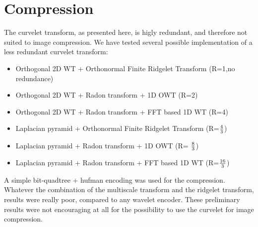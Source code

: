 \documentclass[11pt,a4paper]{article}
\begin{document}
\section{Compression}
The curvelet transform, as presented here, is higly redundant, and therefore
not suited to image compression. We have tested several possible implementation
of a less redundant curvelet transform:
\begin{itemize}
\item Orthogonal 2D WT + Orthonormal Finite Ridgelet Transform (R=1,no redundance)
\item Orthogonal 2D WT + Radon transform + 1D OWT (R=2)
\item Orthogonal 2D WT + Radon transform + FFT based 1D WT (R=4)
\item Laplacian pyramid + Orthonormal Finite Ridgelet Transform (R=${4\over 3}$)
\item Laplacian pyramid + Radon transform + 1D OWT (R= ${8\over 3}$)
\item Laplacian pyramid +  Radon transform + FFT based 1D WT (R=${16\over 3}$)
\end{itemize}
A simple bit-quadtree + hufman encoding was used for the compression.
Whatever the combination of the multiscale transform and the ridgelet transform,
results were really poor, compared to any wavelet encoder. These preliminary
results were not encouraging at all for the possibility to use the curvelet
for image compression.



\end{document}
